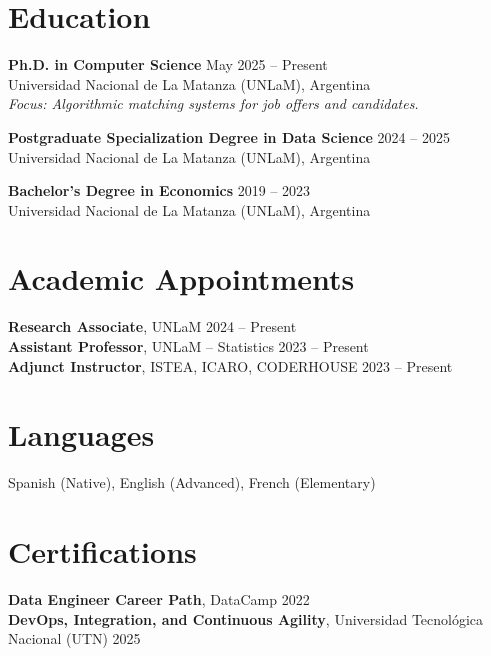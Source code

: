 \documentclass[10pt]{article}
\begin{document}
\section*{Education}
\textbf{Ph.D. in Computer Science} \hfill May 2025 -- Present\\
Universidad Nacional de La Matanza (UNLaM), Argentina\\
\textit{Focus: Algorithmic matching systems for job offers and candidates.}

\vspace{1mm}

\textbf{Postgraduate Specialization Degree in Data Science} \hfill 2024 -- 2025\\
Universidad Nacional de La Matanza (UNLaM), Argentina

\vspace{1mm}

\textbf{Bachelor’s Degree in Economics} \hfill 2019 -- 2023\\
Universidad Nacional de La Matanza (UNLaM), Argentina

\section*{Academic Appointments}
\textbf{Research Associate}, UNLaM \hfill 2024 -- Present\\
\textbf{Assistant Professor}, UNLaM -- Statistics \hfill 2023 -- Present\\
\textbf{Adjunct Instructor}, ISTEA, ICARO, CODERHOUSE \hfill 2023 -- Present

\section*{Languages}
Spanish (Native), English (Advanced), French (Elementary)
\vspace{0.3em}
\section*{Certifications}

\textbf{Data Engineer Career Path}, DataCamp \hfill 2022\\
\textbf{DevOps, Integration, and Continuous Agility}, Universidad Tecnológica Nacional (UTN) \hfill 2025\\
\end{document}
